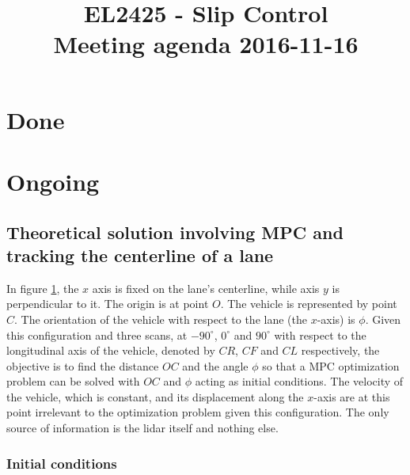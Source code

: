 \documentclass[oneside,12pt]{article}
\title{EL2425 - Slip Control \\ Meeting agenda 2016-11-16}
\begin{document}
\maketitle

\section{Done}




\section{Ongoing}

  \subsection{Theoretical solution involving MPC and tracking the centerline of a lane}


    In figure \ref{fig:centerline_mpc}, the $x$ axis is fixed on the lane's
    centerline, while axis $y$ is perpendicular to it. The origin is at point
    $O$. The vehicle is represented by point $C$. The orientation of the vehicle
    with respect to the lane (the $x$-axis) is $\phi$. Given this configuration
    and three scans, at $-90^{\circ}$, $0^{\circ}$ and $90^{\circ}$ with
    respect to the longitudinal axis of the vehicle, denoted by $CR$, $CF$ and
    $CL$ respectively, the objective is to find the distance $OC$ and the angle
    $\phi$ so that a MPC optimization problem can be solved with $OC$ and $\phi$
    acting as initial conditions. The velocity of the vehicle,
    which is constant, and its displacement along the $x$-axis are at this point
    irrelevant to the optimization problem given this configuration. The only
    source of information is the lidar itself and nothing else.

    \begin{figure}[H]\centering
      \scalebox{1}{}
      \caption{}
      \label{fig:centerline_mpc}
    \end{figure}


    \subsubsection{Initial conditions}
\end{document}
